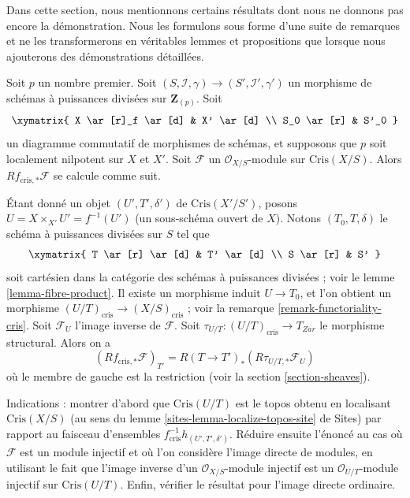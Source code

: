 \noindent
Dans cette section, nous mentionnons certains résultats dont nous ne donnons pas encore la démonstration.
Nous les formulons sous forme d'une suite de remarques et ne les transformerons
en véritables lemmes et propositions que lorsque nous ajouterons des
démonstrations détaillées.

\begin{remark}
\label{remark-compute-direct-image}
Soit $p$ un nombre premier. Soit
$(S, \mathcal{I}, \gamma) \to (S', \mathcal{I}', \gamma')$
un morphisme de schémas à puissances divisées sur $\mathbf{Z}_{(p)}$. Soit
$$
\xymatrix{
X \ar[r]_f \ar[d] & X' \ar[d] \\
S_0 \ar[r] & S'_0
}
$$
un diagramme commutatif de morphismes de schémas, et supposons que $p$ soit
localement nilpotent sur $X$ et $X'$. Soit $\mathcal{F}$ un
$\mathcal{O}_{X/S}$-module sur $\text{Cris}(X/S)$. Alors
$Rf_{\text{cris}, *}\mathcal{F}$ se calcule comme suit.

\medskip\noindent
Étant donné un objet $(U', T', \delta')$ de $\text{Cris}(X'/S')$, posons
$U = X \times_{X'} U' = f^{-1}(U')$ (un sous-schéma ouvert de $X$). Notons
$(T_0, T, \delta)$ le schéma à puissances divisées sur $S$ tel que
$$
\xymatrix{
T \ar[r] \ar[d] & T' \ar[d] \\
S \ar[r] & S'
}
$$
soit cartésien dans la catégorie des schémas à puissances divisées ; voir le
lemme \ref{lemma-fibre-product}. Il existe un
morphisme induit $U \to T_0$, et l'on obtient un morphisme
$(U/T)_{\text{cris}} \to (X/S)_{\text{cris}}$ ; voir la
remarque \ref{remark-functoriality-cris}.
Soit $\mathcal{F}_U$ l'image inverse de $\mathcal{F}$.
Soit $\tau_{U/T} : (U/T)_{\text{cris}} \to T_{Zar}$ le morphisme structural.
Alors on a
\begin{equation}
\label{equation-identify-pushforward}
\left(Rf_{\text{cris}, *}\mathcal{F}\right)_{T'} =
R(T \to T')_*\left(R\tau_{U/T, *} \mathcal{F}_U \right)
\end{equation}
où le membre de gauche est la restriction (voir la
section \ref{section-sheaves}).

\medskip\noindent
Indications : montrer d'abord que $\text{Cris}(U/T)$ est le topos obtenu en localisant $\text{Cris}(X/S)$ (au sens
du lemme \ref{sites-lemma-localize-topos-site} de Sites)
par rapport au faisceau d'ensembles $f_{\text{cris}}^{-1}h_{(U', T', \delta')}$. Réduire ensuite
l'énoncé au cas où $\mathcal{F}$ est un module injectif
et où l'on considère l'image directe de modules, en utilisant le fait que l'image inverse d'un
$\mathcal{O}_{X/S}$-module injectif est un $\mathcal{O}_{U/T}$-module injectif sur
$\text{Cris}(U/T)$. Enfin, vérifier le résultat pour l'image directe ordinaire.
\end{remark}

